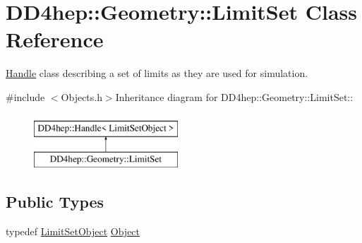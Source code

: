 \hypertarget{class_d_d4hep_1_1_geometry_1_1_limit_set}{
\section{DD4hep::Geometry::LimitSet Class Reference}
\label{class_d_d4hep_1_1_geometry_1_1_limit_set}
}


\hyperlink{class_d_d4hep_1_1_handle}{Handle} class describing a set of limits as they are used for simulation.  


{\ttfamily \#include $<$Objects.h$>$}Inheritance diagram for DD4hep::Geometry::LimitSet::\begin{figure}[H]
\begin{center}
\leavevmode
\includegraphics[height=2cm]{class_d_d4hep_1_1_geometry_1_1_limit_set}
\end{center}
\end{figure}
\subsection*{Public Types}
\begin{DoxyCompactItemize}
\item 
typedef \hyperlink{class_d_d4hep_1_1_geometry_1_1_limit_set_object}{LimitSetObject} \hyperlink{class_d_d4hep_1_1_geometry_1_1_limit_set_a7fc622c60ba15cb5149d6d2ea21ed42e}{Object}
\end{DoxyCompactItemize}
